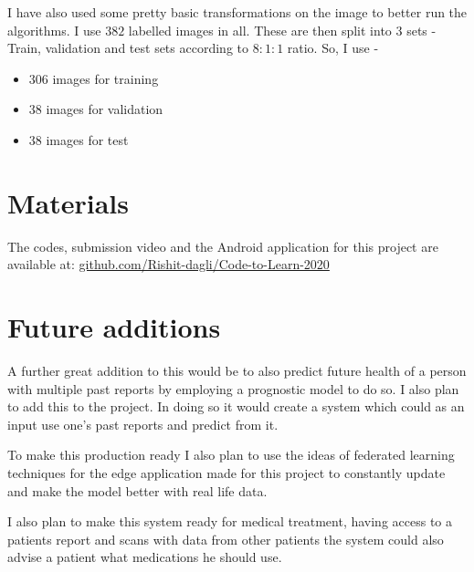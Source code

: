 \documentclass[a4paper]{article}
\begin{document}
\qquad I have also used some pretty basic transformations on the image to better run the algorithms. I use $382$ labelled images in all. These are then split into $3$ sets - Train, validation and test sets according to $8:1:1$ ratio. So, I use -
\begin{itemize}
    \item $306$ images for training
    \item $38$ images for validation
    \item $38$ images for test
\end{itemize}

\section{Materials}

\qquad The codes, submission video and the Android application for this project are available at: \cite{CodeToLearnGH} \href{https://github.com/Rishit-dagli/Code-to-Learn-2020}{github.com/Rishit-dagli/Code-to-Learn-2020}

\section{Future additions}

\qquad A further great addition to this would be to also predict future health of a person with multiple past reports by employing a prognostic model to do so. I also plan to add this to the project. In doing so it would create a system which could as an input use one's past reports and predict from it.

\qquad To make this production ready I also plan to use the ideas of federated learning techniques for the edge application made for this project to constantly update and make the model better with real life data.

\qquad I also plan to make this system ready for medical treatment, having access to a patients report and scans with data from other patients the system could also advise a patient what medications he should use.

\printbibliography
\end{document}
